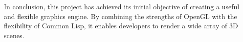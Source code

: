 
\label{SEC:CONCLUSIONS}


In conclusion,
this project has achieved its initial objective of creating a useful and flexible graphics engine.
By combining the strengths of OpenGL with the flexibility of Common Lisp,
it enables developers to render a wide array of 3D scenes.
